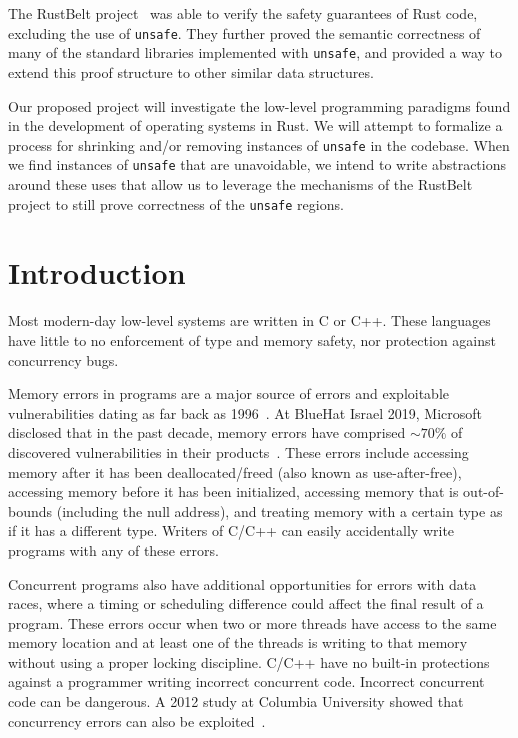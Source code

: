\documentclass[12pt]{article}
\begin{document}
The RustBelt project~\cite{jung2017rustbelt} was able to verify the safety guarantees of Rust code, excluding the use of \texttt{unsafe}. They further proved the semantic correctness of many of the standard libraries implemented with \texttt{unsafe}, and provided a way to extend this proof structure to other similar data structures.

Our proposed project will investigate the low-level programming paradigms found in the development of operating systems in Rust. We will attempt to formalize a process for shrinking and/or removing instances of \texttt{unsafe} in the codebase. When we find instances of \texttt{unsafe} that are unavoidable, we intend to write abstractions around these uses that allow us to leverage the mechanisms of the RustBelt project to still prove correctness of the \texttt{unsafe} regions.


\section{Introduction}
Most modern-day low-level systems are written in C or C++. These languages have little to no enforcement of type and memory safety, nor protection against concurrency bugs.

Memory errors in programs are a major source of errors and exploitable vulnerabilities dating as far back as 1996~\cite{one1996smashing}. At BlueHat Israel 2019, Microsoft disclosed that in the past decade, memory errors have comprised $\sim70\%$ of discovered vulnerabilities in their products~\cite{miller2019trends}. These errors include accessing memory after it has been deallocated/freed (also known as use-after-free), accessing memory before it has been initialized, accessing memory that is out-of-bounds (including the null address), and treating memory with a certain type as if it has a different type. Writers of C/C++ can easily accidentally write programs with any of these errors.

Concurrent programs also have additional opportunities for errors with data races, where a timing or scheduling difference could affect the final result of a program. These errors occur when two or more threads have access to the same memory location and at least one of the threads is writing to that memory without using a proper locking discipline. C/C++ have no built-in protections against a programmer writing incorrect concurrent code. Incorrect concurrent code can be dangerous. A 2012 study at Columbia University showed that concurrency errors can also be exploited~\cite{yang2012concurrency}.
\end{document}
